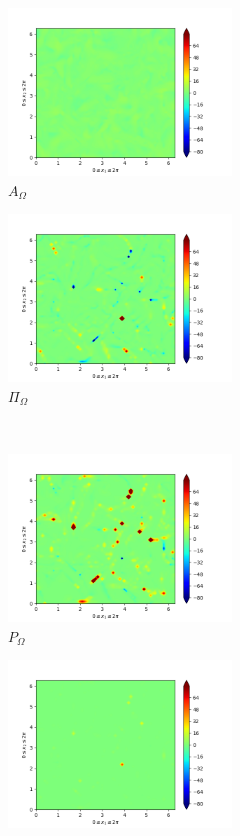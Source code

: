 \begin{figure}[H]
\begin{subfigure}{0.45\textwidth}
        \includegraphics[height=1.75in]{media/run-cds-65/A-enst-1340.png}
        \caption{$A_{\Omega}$}
    \end{subfigure}
    \newline
    \begin{subfigure}{0.45\textwidth}
        \includegraphics[height=1.75in]{media/run-cds-65/Pi-enst-1340.png}
        \caption{$\Pi_{\Omega}$}
    \end{subfigure}
    ~
    \begin{subfigure}{0.45\textwidth}
        \includegraphics[height=1.75in]{media/run-cds-65/P-enst-1340.png}
        \caption{$P_{\Omega}$}
    \end{subfigure}
    \newline
    \begin{subfigure}{0.45\textwidth}
        \includegraphics[height=1.75in]{media/run-cds-65/B-enst-1340.png}

\end{subfigure}
\end{figure}
